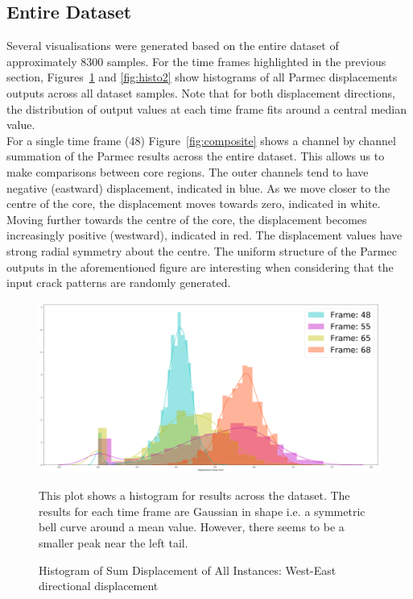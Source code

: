 \subsection{Entire Dataset} \label{data:entire}


Several visualisations were generated based on the entire dataset of approximately 8300 samples. For the time frames highlighted in the previous section, Figures~\ref{fig:histo1} and \ref{fig:histo2} show histograms of all Parmec displacements outputs across all dataset samples. Note that for both displacement directions, the distribution of output values at each time frame fits around a central median value.
\\

\noindent
For a single time frame (48) Figure~\ref{fig:composite} shows a channel by channel summation of the Parmec results across the entire dataset. This allows us to make comparisons between core regions. The outer channels tend to have negative (eastward) displacement, indicated in blue. As we move closer to the centre of the core, the displacement moves towards zero, indicated in white. Moving further towards the centre of the core, the displacement becomes increasingly positive (westward), indicated in red. The displacement values have strong radial symmetry about the centre. The uniform structure of the Parmec outputs in the aforementioned figure are interesting when considering that the input crack patterns are randomly generated.  
\\


\begin{figure}[p]
	\centering
	\includegraphics[scale=0.15]{Figures/histo1.png}
	\caption{Histogram of Sum Displacement of All Instances: West-East directional displacement } {This plot shows a histogram for results across the dataset. The results for each time frame are Gaussian in shape i.e. a symmetric bell curve around a mean value. However, there seems to be a smaller peak near the left tail.}
	\label{fig:histo1}
\end{figure}

